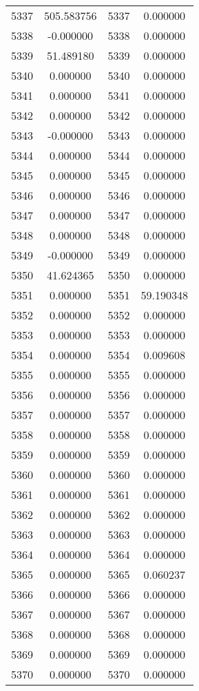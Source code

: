 \documentclass[12pt]{article}
\begin{document}
\begin{longtable}{@{}cccc@{}}
5337 & 505.583756 & 5337 & 0.000000 \\
5338 & -0.000000 & 5338 & 0.000000 \\
5339 & 51.489180 & 5339 & 0.000000 \\
5340 & 0.000000 & 5340 & 0.000000 \\
5341 & 0.000000 & 5341 & 0.000000 \\
5342 & 0.000000 & 5342 & 0.000000 \\
5343 & -0.000000 & 5343 & 0.000000 \\
5344 & 0.000000 & 5344 & 0.000000 \\
5345 & 0.000000 & 5345 & 0.000000 \\
5346 & 0.000000 & 5346 & 0.000000 \\
5347 & 0.000000 & 5347 & 0.000000 \\
5348 & 0.000000 & 5348 & 0.000000 \\
5349 & -0.000000 & 5349 & 0.000000 \\
5350 & 41.624365 & 5350 & 0.000000 \\
5351 & 0.000000 & 5351 & 59.190348 \\
5352 & 0.000000 & 5352 & 0.000000 \\
5353 & 0.000000 & 5353 & 0.000000 \\
5354 & 0.000000 & 5354 & 0.009608 \\
5355 & 0.000000 & 5355 & 0.000000 \\
5356 & 0.000000 & 5356 & 0.000000 \\
5357 & 0.000000 & 5357 & 0.000000 \\
5358 & 0.000000 & 5358 & 0.000000 \\
5359 & 0.000000 & 5359 & 0.000000 \\
5360 & 0.000000 & 5360 & 0.000000 \\
5361 & 0.000000 & 5361 & 0.000000 \\
5362 & 0.000000 & 5362 & 0.000000 \\
5363 & 0.000000 & 5363 & 0.000000 \\
5364 & 0.000000 & 5364 & 0.000000 \\
5365 & 0.000000 & 5365 & 0.060237 \\
5366 & 0.000000 & 5366 & 0.000000 \\
5367 & 0.000000 & 5367 & 0.000000 \\
5368 & 0.000000 & 5368 & 0.000000 \\
5369 & 0.000000 & 5369 & 0.000000 \\
5370 & 0.000000 & 5370 & 0.000000 \\

\end{longtable}
\end{document}
